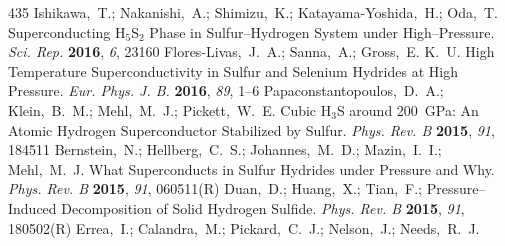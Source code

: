\documentclass[12pt,letterpaper,oneside]{article}
\begin{document}
\begin{mcitethebibliography}{435}
\mciteBstWouldAddEndPuncttrue
\mciteSetBstMidEndSepPunct{\mcitedefaultmidpunct}
{\mcitedefaultendpunct}{\mcitedefaultseppunct}\relax
\EndOfBibitem
{}
Ishikawa,~T.; Nakanishi,~A.; Shimizu,~K.; Katayama-Yoshida,~H.; Oda,~T.
    Superconducting H$_5$S$_2$ Phase in Sulfur--Hydrogen System
  under High--Pressure. \emph{Sci. Rep.} \textbf{2016}, \emph{6}, 23160\relax
\mciteBstWouldAddEndPuncttrue
\mciteSetBstMidEndSepPunct{\mcitedefaultmidpunct}
{\mcitedefaultendpunct}{\mcitedefaultseppunct}\relax
\EndOfBibitem
{}
Flores-Livas,~J.~A.; Sanna,~A.; Gross,~E. K.~U. High Temperature
  Superconductivity in Sulfur and Selenium Hydrides at High Pressure.
  \emph{Eur. Phys. J. B.} \textbf{2016}, \emph{89}, 1--6\relax
\mciteBstWouldAddEndPuncttrue
\mciteSetBstMidEndSepPunct{\mcitedefaultmidpunct}
{\mcitedefaultendpunct}{\mcitedefaultseppunct}\relax
\EndOfBibitem
{}
Papaconstantopoulos,~D.~A.; Klein,~B.~M.; Mehl,~M.~J.; Pickett,~W.~E. Cubic
  H$_3$S around 200~GPa: An Atomic Hydrogen Superconductor Stabilized by
  Sulfur. \emph{Phys. Rev. B} \textbf{2015}, \emph{91}, 184511\relax
\mciteBstWouldAddEndPuncttrue
\mciteSetBstMidEndSepPunct{\mcitedefaultmidpunct}
{\mcitedefaultendpunct}{\mcitedefaultseppunct}\relax
\EndOfBibitem
{}
Bernstein,~N.; Hellberg,~C.~S.; Johannes,~M.~D.; Mazin,~I.~I.; Mehl,~M.~J. What
  Superconducts in Sulfur Hydrides under Pressure and Why. \emph{Phys. Rev. B}
  \textbf{2015}, \emph{91}, 060511(R)\relax
\mciteBstWouldAddEndPuncttrue
\mciteSetBstMidEndSepPunct{\mcitedefaultmidpunct}
{\mcitedefaultendpunct}{\mcitedefaultseppunct}\relax
\EndOfBibitem
{}
Duan,~D.; Huang,~X.; Tian,~F.;   Pressure--Induced
  Decomposition of Solid Hydrogen Sulfide. \emph{Phys. Rev. B} \textbf{2015},
  \emph{91}, 180502(R)\relax
\mciteBstWouldAddEndPuncttrue
\mciteSetBstMidEndSepPunct{\mcitedefaultmidpunct}
{\mcitedefaultendpunct}{\mcitedefaultseppunct}\relax
\EndOfBibitem
{}
Errea,~I.; Calandra,~M.; Pickard,~C.~J.; Nelson,~J.; Needs,~R.~J.

\end{mcitethebibliography}
\end{document}
